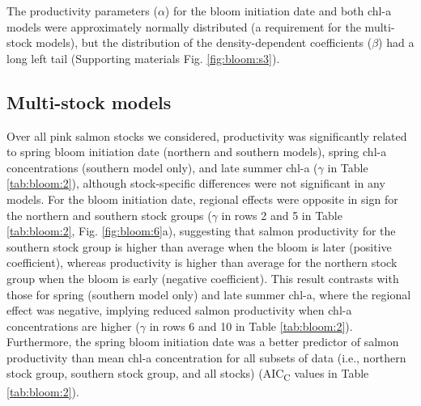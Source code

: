 The productivity parameters (\(\alpha\)) for the bloom initiation date and both
chl-a models were approximately normally distributed (a requirement for the
multi-stock models), but the distribution of the density-dependent coefficients
(\(\beta\)) had a long left tail (Supporting materials Fig. \ref{fig:bloom:s3}).


\subsection{Multi-stock models}

Over all pink salmon stocks we considered, productivity was significantly
related to spring bloom initiation date (northern and southern models), spring
chl-a concentrations (southern model only), and late summer chl-a (\(\gamma\) in
Table \ref{tab:bloom:2}), although stock-specific differences were not
significant in any models. For the bloom initiation date, regional effects were
opposite in sign for the northern and southern stock groups (\(\gamma\) in rows
2 and 5 in Table \ref{tab:bloom:2}, Fig. \ref{fig:bloom:6}a), suggesting that
salmon productivity for the southern stock group is higher than average when the
bloom is later (positive coefficient), whereas productivity is higher than
average for the northern stock group when the bloom is early (negative
coefficient). This result contrasts with those for spring (southern model only)
and late summer chl-a, where the regional effect was negative, implying reduced
salmon productivity when chl-a concentrations are higher (\(\gamma\) in rows 6
and 10 in Table \ref{tab:bloom:2}). Furthermore, the spring bloom initiation
date was a better predictor of salmon productivity than mean chl-a concentration
for all subsets of data (i.e., northern stock group, southern stock group, and
all stocks) (AIC\textsubscript{C} values in Table \ref{tab:bloom:2}).

